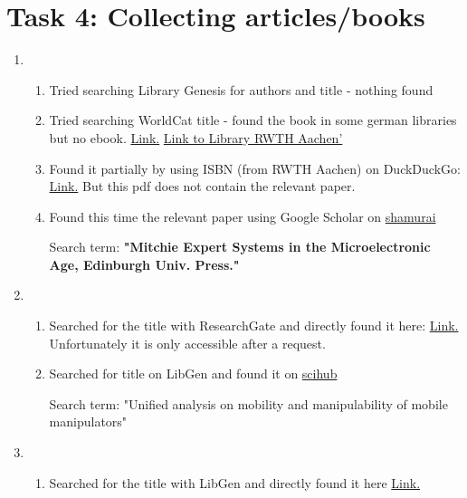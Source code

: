 \documentclass{article}
\begin{document}
\section*{Task 4: Collecting articles/books}
\begin{enumerate}
    \item \begin{enumerate}
        \item Tried searching Library Genesis for authors and title - nothing found
        \item Tried searching WorldCat title - found the book in some german libraries but no ebook. \href{https://www.worldcat.org/title/expert-systems-in-the-micro-electronic-age/oclc/6512638}{Link.}
        \href{https://index.ub.rwth-aachen.de/TouchPointClient_touchpoint/singleHit.do?methodToCall=showHit&curPos=1&identifier=2_SOLR_SERVER_1667438747}{Link to Library RWTH Aachen'}
        \item Found it partially by using ISBN (from RWTH Aachen) on DuckDuckGo: \href{https://stacks.stanford.edu/file/druid:tm169ds9492/tm169ds9492.pdf}{Link.}
        But this pdf does not contain the relevant paper.
        \item Found this time the relevant paper using Google Scholar on \href{http://www.shamurai.com/files/Hayes_1979.pdf}{shamurai}
        
        Search term: \textbf{"Mitchie Expert Systems in the Microelectronic Age, Edinburgh Univ. Press."}
        
    \end{enumerate}
    \item \begin{enumerate}
        \item Searched for the title with ResearchGate and directly found it here: 
        \href{https://www.researchgate.net/publication/3802831_Unified_analysis_on_mobility_and_manipulability_of_mobile_manipulators}{Link.}
        Unfortunately it is only accessible after a request. 
        \item Searched for title on LibGen and found it on \href{http://libgen.rs/scimag/10.1109%2Frobot.1999.772525/}{scihub}
        
        Search term: "Unified analysis on mobility and manipulability of mobile manipulators"
    \end{enumerate}

    \item \begin{enumerate}
        \item Searched for the title with LibGen and directly found it here \href{http://library.lol/main/6A6947E0F0669F307D90C679A2D060CB}{Link.}
        

\end{enumerate}
\end{enumerate}
\end{document}
